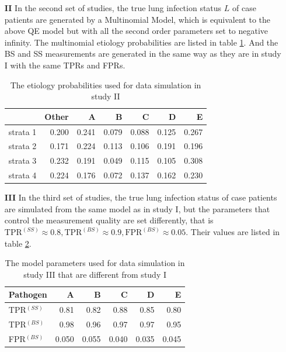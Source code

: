 \documentclass[11 pt, a4paper]{article}  %
\begin{document}
\begin{itemize}
\item[{\bf II}]
In the second set of studies, the true lung infection status $L$ of case patients are generated by a Multinomial Model, which is equivalent to the above QE model but with all the second order parameters set to negative infinity. The multinomial etiology probabilities are listed in table \ref{tab:study2}. And the BS and SS measurements are generated in the same way as they are in study I with the same TPRs and FPRs.

\begin{table}[h]
\centering
\caption{The etiology probabilities used for data simulation in study II}
\label{tab:study2}
\begin{tabular}{lrrrrrr}
\hline
         & Other & A     & B     & C     & D     & E     \\ \hline
strata 1 & 0.200 & 0.241 & 0.079 & 0.088 & 0.125 & 0.267 \\
strata 2 & 0.171 & 0.224 & 0.113 & 0.106 & 0.191 & 0.196 \\
strata 3 & 0.232 & 0.191 & 0.049 & 0.115 & 0.105 & 0.308 \\
strata 4 & 0.224 & 0.176 & 0.072 & 0.137 & 0.162 & 0.230 \\ \hline
\end{tabular}
\end{table}

\item[{\bf III}]
In the third set of studies, the true lung infection status of case patients are simulated from the same model as in study I, but the parameters that control the measurement quality are set differently, that is $\text{TPR}^{(SS)} \approx 0.8,  \text{TPR}^{(BS)} \approx 0.9, \text{FPR}^{(BS)} \approx 0.05$. Their values are listed in table \ref{tab:study3}.\\

\begin{table}[h]
\centering
\caption{The model parameters used for data simulation in study III that are different from study I}
\label{tab:study3}
\begin{tabular}{lrrrrr}
\hline
Pathogen     & A    & B     & C     & D     & E    \\ \hline
TPR$^{(SS)}$ & 0.81 & 0.82  & 0.88  & 0.85  & 0.80 \\
TPR$^{(BS)}$ & 0.98 & 0.96  & 0.97  & 0.97  & 0.95 \\
FPR$^{(BS)}$ & 0.050 & 0.055  & 0.040  & 0.035  & 0.045 \\ \hline
\end{tabular}
\end{table}

\end{itemize}
\end{document}
